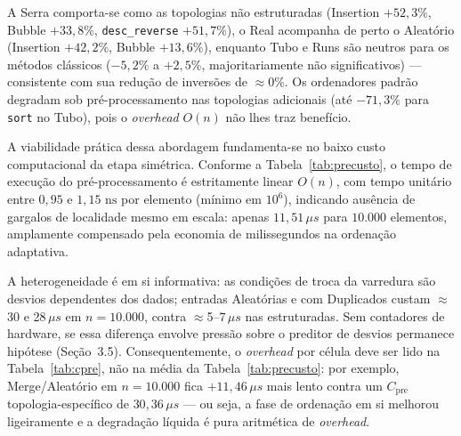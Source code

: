\documentclass[portuguese]{sbc2025}%
\begin{document}
A Serra comporta-se como as topologias não estruturadas (Insertion $+52{,}3\%$, Bubble $+33{,}8\%$, \texttt{desc\_reverse} $+51{,}7\%$), o Real acompanha de perto o Aleatório (Insertion $+42{,}2\%$, Bubble $+13{,}6\%$), enquanto Tubo e Runs são neutros para os métodos clássicos ($-5{,}2\%$ a $+2{,}5\%$, majoritariamente não significativos) --- consistente com sua redução de inversões de $\approx$0\%. Os ordenadores padrão degradam sob pré-processamento nas topologias adicionais (até $-71{,}3\%$ para \texttt{sort} no Tubo), pois o \emph{overhead} $O(n)$ não lhes traz benefício.

A viabilidade prática dessa abordagem fundamenta-se no baixo custo computacional da etapa simétrica. Conforme a Tabela~\ref{tab:precusto}, o tempo de execução do pré-processamento é estritamente linear $O(n)$, com tempo unitário entre $0{,}95$ e $1{,}15\text{ ns}$ por elemento (mínimo em $10^6$), indicando ausência de gargalos de localidade mesmo em escala: apenas $11{,}51\,\mu s$ para $10.000$ elementos, amplamente compensado pela economia de milissegundos na ordenação adaptativa.

\begin{table}[htbp]
\centering
\caption{Custo médio do pré-processamento simétrico em função do tamanho do vetor (média sobre os tipos disponíveis, via ferramenta CLI, seed 42; Real apenas até $N{=}477.104$, logo ausente em $10^6$). O ponto $n{=}20{.}000$ foi incluído exclusivamente para caracterização da linearidade e não faz parte da matriz principal de tempos de ordenação. A média CLI difere da média do \emph{harness} Criterion (Tabela~\ref{tab:cpre}) por metodologia e cobertura distintas.}
\label{tab:precusto}

\end{table}

\begin{table}[htbp]
\centering
\caption{Custo isolado do pré-processamento $C_{\text{pre}}$ por topologia (mesmo harness Criterion da matriz de tempos; média, $\mu s$). A média CLI da Tabela~\ref{tab:precusto} esconde forte heterogeneidade: entradas não estruturadas (Aleatório, Duplicados) custam $\approx$5$\times$ mais que as estruturadas em $n{=}10.000$. Real não tem ponto em $10^6$ (teto do asset nativo).}
\label{tab:cpre}

\end{table}

A heterogeneidade é em si informativa: as condições de troca da varredura são desvios dependentes dos dados; entradas Aleatórias e com Duplicados custam $\approx$30 e 28\,$\mu s$ em $n{=}10.000$, contra $\approx$5--7\,$\mu s$ nas estruturadas. Sem contadores de hardware, se essa diferença envolve pressão sobre o preditor de desvios permanece hipótese (Seção~3.5). Consequentemente, o \emph{overhead} por célula deve ser lido na Tabela~\ref{tab:cpre}, não na média da Tabela~\ref{tab:precusto}: por exemplo, Merge/Aleatório em $n{=}10.000$ fica $+11{,}46\,\mu s$ mais lento contra um $C_{\text{pre}}$ topologia-específico de $30{,}36\,\mu s$ --- ou seja, a fase de ordenação em si melhorou ligeiramente e a degradação líquida é pura aritmética de \emph{overhead}.
\end{document}
